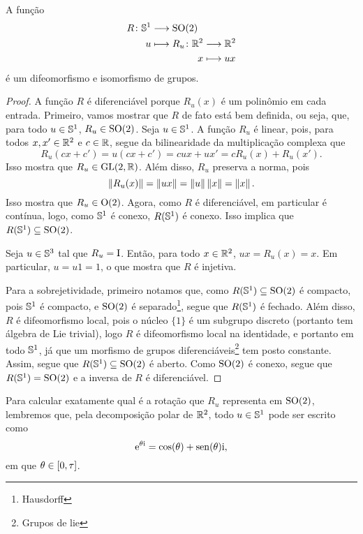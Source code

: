\begin{proposition}
A função
	\begin{align*}
	\func{R}{\S^1}{\SO(2)}{u}{
		\begin{aligned}[t]
			\func{R_u}{\R^2}{\R^2}{x}{ux}
		\end{aligned}
	}
	\end{align*}
é um difeomorfismo e isomorfismo de grupos.
\end{proposition}
\begin{proof}
A função $R$ é diferenciável porque $R_u(x)$ é um polinômio em cada entrada. Primeiro, vamos mostrar que $R$ de fato está bem definida, ou seja, que, para todo $u \in \S^1$, $R_u \in \SO(2)$. Seja $u \in \S^1$. A função $R_u$ é linear, pois, para todos $x,x' \in \R^2$ e $c \in \R$, segue da bilinearidade da multiplicação complexa que
	\begin{equation*}
	R_u(cx+c') = u(cx+c') = cux + ux' = cR_u(x) + R_u(x').
	\end{equation*}
Isso mostra que $R_u \in \GL(2,\R)$. Além disso, $R_u$ preserva a norma, pois
	\begin{equation*}
	\nor{R_u(x)} = \nor{ux} = \nor{u}\nor{x} = \nor{x}.
	\end{equation*}
Isso mostra que $R_u \in \GO(2)$. Agora, como $R$ é diferenciável, em particular é contínua, logo, como $\S^1$ é conexo, $R(\S^1)$ é conexo. Isso implica que $R(\S^1) \subseteq \SO(2)$.

Seja $u \in \S^3$ tal que $R_u = \Id$. Então, para todo $x \in \R^2$, $ux = R_u(x) = x$. Em particular, $u = u1 = 1$, o que mostra que $R$ é injetiva.

Para a sobrejetividade, primeiro notamos que, como $R(\S^1) \subseteq \SO(2)$ é compacto, pois $\S^1$ é compacto, e $\SO(2)$ é separado\footnote{Hausdorff}, segue que $R(\S^1)$ é fechado. Além disso, $R$ é difeomorfismo local, pois o núcleo $\{1\}$ é um subgrupo discreto (portanto tem álgebra de Lie trivial), logo $R$ é difeomorfismo local na identidade, e portanto em todo $\S^1$, já que um morfismo de grupos diferenciáveis\footnote{Grupos de lie} tem posto constante. Assim, segue que $R(\S^1) \subseteq \SO(2)$ é aberto. Como $\SO(2)$ é conexo, segue que $R(\S^1) = \SO(2)$ e a inversa de $R$ é diferenciável.
\end{proof}

Para calcular exatamente qual é a rotação que $R_u$ representa em $\SO(2)$, lembremos que, pela decomposição polar de $\R^2$, todo $u \in \S^1$ pode ser escrito como
	\begin{equation*}
	\e^{\theta\ii} = \cos(\theta) + \sin(\theta)\ii,
	\end{equation*}
em que $\theta \in \intff{0}{\tau}$.

